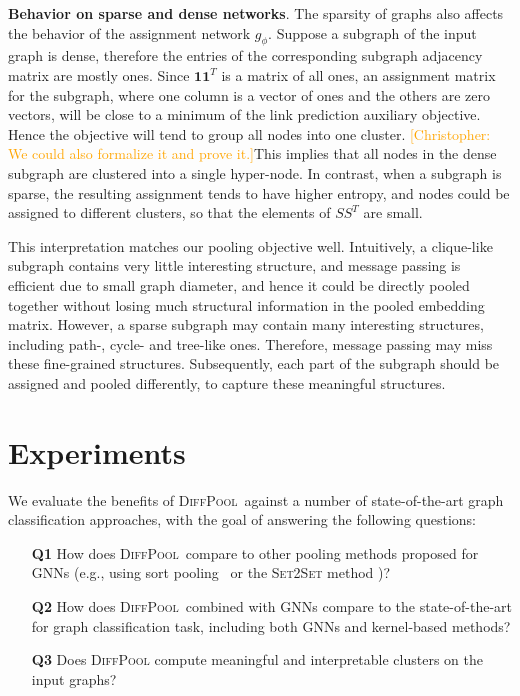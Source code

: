 \documentclass{article}
\newcommand{\chris}[1]{{{\textcolor{orange}{[Christopher: #1]}}}}
\newcommand{\xhdr}[1]{{\noindent\bfseries #1}.}
\newcommand{\name}{\textsc{DiffPool}\xspace}
\begin{document}
{\xhdr{Behavior on sparse and dense networks}
The sparsity of graphs also affects the behavior of the assignment network $g_\phi$.
Suppose a subgraph of the input graph is dense, therefore the entries of the corresponding subgraph adjacency matrix are mostly ones. Since  $\mathbf{1} \mathbf{1}^T$ is a matrix of all ones, an assignment matrix for the subgraph, where one column is a vector of ones and the others are zero vectors, will be close to a minimum of the link prediction auxiliary objective. Hence the objective will tend to group all nodes into one cluster. \chris{We could also formalize it and prove it.}This  implies that all nodes in the dense subgraph are clustered into a single hyper-node. In contrast, when a subgraph is sparse, the resulting assignment tends to have higher entropy, and nodes could be assigned to different clusters, so that the elements of $S S^T$ are small.

This interpretation matches our pooling objective well. Intuitively, a clique-like subgraph contains very little interesting structure, and message passing is efficient due to small graph diameter, and hence it could be directly pooled together without losing much structural information in the pooled embedding matrix. However, a sparse subgraph may contain many interesting structures, including path-, cycle- and tree-like ones. Therefore, message passing may miss these fine-grained structures. Subsequently, each part of the subgraph should be assigned and pooled differently, to capture these meaningful structures. 

}
 \section{Experiments}
\label{sec:ex}

We evaluate the benefits of \name\ against a number of state-of-the-art graph classification approaches, with the goal of answering the following questions:
\begin{enumerate}[leftmargin=20pt]
\item[{\bf Q1}] How does  \name\ compare to other pooling methods proposed for GNNs (e.g., using sort pooling~\cite{zhang2018end} or the \textsc{Set2Set} method \cite{Gil+2017})?
\item[{\bf Q2}] How does  \name\ combined with GNNs compare to the state-of-the-art for graph classification task, including both GNNs and kernel-based methods?
\item[{\bf Q3}] Does  \name  compute meaningful and interpretable clusters on the input graphs?
\end{enumerate}
\end{document}
